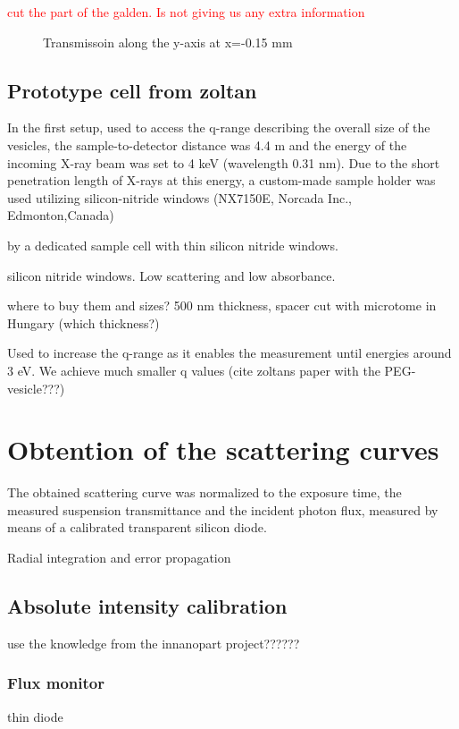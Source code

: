 \textcolor{red}{cut the part of the galden. Is not giving us any extra information}

\begin{figure}%
	\centering
		
		\caption{Transmissoin along the y-axis at x=-0.15 mm}
		\label{fig:GaldenCalibration}
\end{figure}

\subsection{Prototype cell from zoltan}

In the first setup, used to access the q-range describing the overall size of the vesicles, the sample-to-detector distance was 4.4 m and the energy of the incoming X-ray beam was set to 4 keV (wavelength 0.31 nm). Due to the short penetration length of X-rays at this energy, a custom-made sample holder was used utilizing silicon-nitride windows (NX7150E, Norcada Inc., Edmonton,Canada)

by a dedicated sample cell with thin silicon nitride windows. 

silicon nitride windows. Low scattering and low absorbance. 

where to buy them and sizes? 500 nm thickness, spacer cut with microtome in Hungary (which thickness?)

Used to increase the q-range as it enables the measurement until energies around 3 eV. We achieve much smaller q values (cite zoltans paper with the PEG-vesicle???)

\section{Obtention of the scattering curves}

The obtained scattering curve was normalized to the exposure time, the measured suspension transmittance and the incident photon flux, measured by means of a calibrated transparent silicon diode. 

Radial integration and error propagation

\subsection{Absolute intensity calibration}
use the knowledge from the innanopart project??????
\subsubsection{Flux monitor}
thin diode
